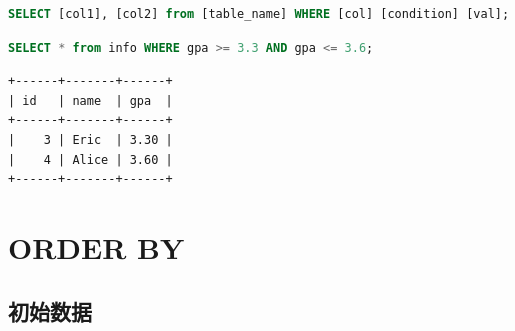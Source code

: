 \documentclass[12pt, openany, oneside]{book}
\begin{document}
\vspace{-0.5cm}

\begin{lstlisting}[language=SQL]
SELECT [col1], [col2] from [table_name] WHERE [col] [condition] [val];
\end{lstlisting}

\begin{table}[H]
	\centering
	\caption{运算符}
\end{table}


\begin{lstlisting}[language=SQL]
SELECT * from info WHERE gpa >= 3.3 AND gpa <= 3.6;
\end{lstlisting}

\begin{tcolorbox}
\begin{verbatim}
+------+-------+------+
| id   | name  | gpa  |
+------+-------+------+
|    3 | Eric  | 3.30 |
|    4 | Alice | 3.60 |
+------+-------+------+
\end{verbatim}
\end{tcolorbox}

\newpage

\chapter{ORDER BY}

\section{初始数据}
\end{document}
